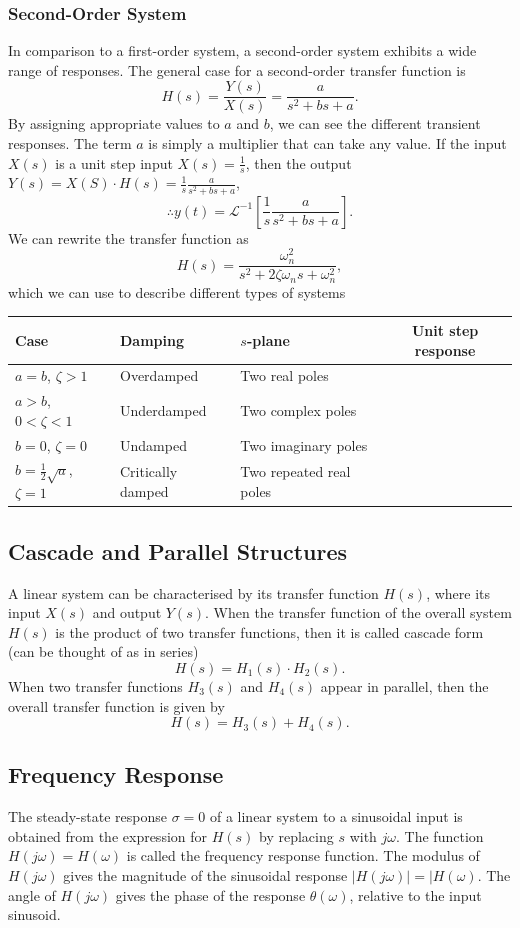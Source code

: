 \documentclass{article}
\begin{document}
\subsubsection{Second-Order System}
In comparison to a first-order system, a second-order system exhibits a wide range of responses. The general case for a second-order transfer function is
\[
    H(s)=\frac{Y(s)}{X(s)}=\frac{a}{s^2+bs+a}.
\]
By assigning appropriate values to $a$ and $b$, we can see the different transient responses. The term $a$ is simply a multiplier that can take any value. If the input $X(s)$ is a unit step input $X(s)=\frac{1}{s}$, then the output $Y(s)=X(S)\cdot H(s)=\frac{1}{s}\frac{a}{s^2+bs+a}$, 
\[
    \therefore y(t)=\mathcal{L}^{-1}\left[ \frac{1}{s}\frac{a}{s^2+bs+a} \right].
\]
We can rewrite the transfer function as 
\[
    H(s)=\frac{\omega _n^2}{s^2+2\zeta \omega _ns+\omega _n^2},
\]
which we can use to describe different types of systems
\begin{table}[H]
    \centering
    \label{tab:s5-t1}
    \begin{tabular}{l|l|l|c}
        Case & Damping & $s$-plane & Unit step response \\
        \hline
        \hline
        $a=b$, $\zeta >1$ & Overdamped & Two real poles & \\
        $a>b$, $0<\zeta <1$ & Underdamped & Two complex poles & \\
        $b=0$, $\zeta =0$ & Undamped & Two imaginary poles & \\
        $b=\frac{1}{2}\sqrt{a}$, $\zeta =1$ & Critically damped & Two repeated real poles & \\
    \end{tabular}
\end{table}

\subsection{Cascade and Parallel Structures}
A linear system can be characterised by its transfer function $H(s)$, where its input $X(s)$ and output $Y(s)$. When the transfer function of the overall system $H(s)$ is the product of two transfer functions, then it is called cascade form (can be thought of as in series)
\[
    H(s)=H_1(s)\cdot H_2(s).
\]
When two transfer functions $H_3(s)$ and $H_4(s)$ appear in parallel, then the overall transfer function is given by
\[
    H(s)=H_3(s)+H_4(s).
\]

\subsection{Frequency Response}
The steady-state response $\sigma =0$ of a linear system to a sinusoidal input is obtained from the expression for $H(s)$ by replacing $s$ with $j\omega $. The function $H(j\omega )=H(\omega )$ is called the frequency response function. The modulus of $H(j\omega )$ gives the magnitude of the sinusoidal response $|H(j\omega )|=|H(\omega )$. The angle of $H(j\omega )$ gives the phase of the response $\theta (\omega )$, relative to the input sinusoid.
\end{document}
